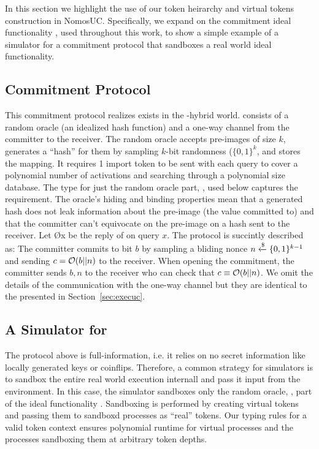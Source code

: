 In this section we highlight the use of our token heirarchy and virtual tokens construction in NomosUC.
Specifically, we expand on the commitment ideal functionality \Fcom, used throughout this work, to show a simple example of a simulator for a commitment protocol that sandboxes a real world ideal functionality. 

\subsection{Commitment Protocol}
This commitment protocol realizes \Fcom exists in the \Fropp-hybrid world. \Fropp consists of a random oracle (an idealized hash function) and a one-way channel from the committer to the receiver. 
The random oracle accepts pre-images of size $k$, generates a ``hash'' for them by sampling $k$-bit randomness ($\{0,1\}^k$, and stores the mapping.
It requires 1 import token to be sent with each query to cover a polynomial number of activations and searching through a polynomial size database. The type for just the random oracle part, \Fro, used below captures the requirement. 
The oracle's hiding and binding properties mean that a generated hash does not leak information about the pre-image (the value committed to)  and that the committer can't equivocate on the pre-image on a hash sent to the receiver. 
Let \O{x} be the reply of \Fropp on query $x$. The protocol is succintly described as: 
The committer commits to bit $b$ by sampling a bliding nonce $n \xleftarrow{\$} \{0,1\}^{k-1}$ and sending $c = \mathcal{O}(b || n)$ to the receiver. When opening the commitment, the committer sends $b, n$ to the receiver who can check that $c \equiv \mathcal{O}(b || n)$.
We omit the details of the communication with the one-way channel but they are identical to the \Fauth presented in Section~\ref{sec:execuc}.

\subsection{A Simulator for \Fcom}
The protocol above is full-information, i.e. it relies on no secret information like locally generated keys or coinflips. 
Therefore, a common strategy for simulators is to sandbox the entire real world execution internall and pass it input from the environment.
In this case, the simulator \simcom sandboxes only the random oracle, \Fro, part of the ideal functionality \Fropp. 
Sandboxing is performed by creating virtual tokens and passing them to sandboxd processes as ``real'' tokens. 
Our typing rules for a valid token context ensures polynomial runtime for virtual processes and the processes sandboxing them at arbitrary token depths.

